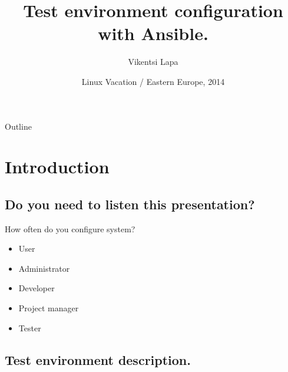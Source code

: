 \documentclass[16pt]{beamer}
\title %
{Test environment configuration with Ansible.}
\author[Vikentsi Lapa] %
{Vikentsi Lapa}
\institute[EPAM Systems] %
\date[LVEE 2014] %
{ Linux Vacation / Eastern Europe, 2014}
\begin{document}
\begin{frame}
  \titlepage
\end{frame}

\begin{frame}{Outline}
  \tableofcontents
\end{frame}





\section{Introduction}

\subsection{Do you need to listen this presentation? }

\begin{frame}{How often do you configure system?}

  \begin{itemize}
  \item<+->
     User 
  \item<+->
     Administrator
  \item<+->
     Developer
  \item<+->
     Project manager
  \item<+->
     Tester
  \end{itemize}
\end{frame}

\subsection{Test environment description.}
\end{document}
